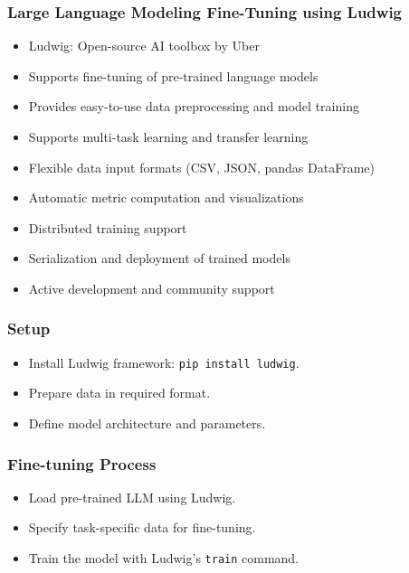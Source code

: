 \begin{frame}[fragile]\frametitle{Large Language Modeling Fine-Tuning using Ludwig}
\begin{itemize}
    \item Ludwig: Open-source AI toolbox by Uber
    \item Supports fine-tuning of pre-trained language models
    \item Provides easy-to-use data preprocessing and model training
    \item Supports multi-task learning and transfer learning
    \item Flexible data input formats (CSV, JSON, pandas DataFrame)
    \item Automatic metric computation and visualizations
    \item Distributed training support %
    \item Serialization and deployment of trained models
    \item Active development and community support
\end{itemize}
\end{frame}


\begin{frame}[fragile]\frametitle{Setup}
    \begin{itemize}
        \item Install Ludwig framework: \lstinline{pip install ludwig}.
        \item Prepare data in required format.
        \item Define model architecture and parameters.
    \end{itemize}
\end{frame}

\begin{frame}[fragile]\frametitle{Fine-tuning Process}
    \begin{itemize}
        \item Load pre-trained LLM using Ludwig.
        \item Specify task-specific data for fine-tuning.
        \item Train the model with Ludwig's \lstinline{train} command.
    \end{itemize}
\end{frame}

